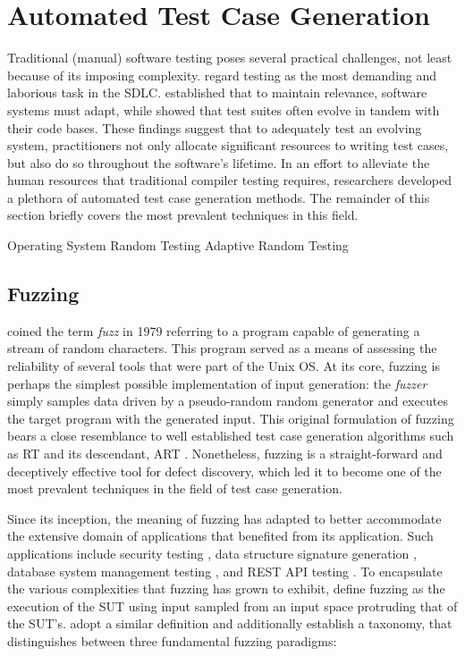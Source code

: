 \section{Automated Test Case Generation}

Traditional (manual) software testing poses several practical
challenges, not least because of its imposing complexity.
\citet{candea2019automated} regard testing as the most
demanding and laborious task in the \gls{SDLC}.
\citet{lehman1979understanding} established that to maintain
relevance, software systems must adapt, while \citet{zaidman2011studying}
showed that test suites often evolve in tandem with their code bases.
These findings suggest that to adequately test an evolving system,
practitioners not only allocate significant resources to writing test cases,
but also do so throughout the software's lifetime.
In an effort to alleviate the human resources that traditional compiler testing requires,
researchers developed a plethora of automated test case generation methods.
The remainder of this section briefly covers the most prevalent techniques
in this field.

 {Operating System}
 {Random Testing}
 {Adaptive Random Testing}

\subsection{Fuzzing}

\citet{miller1990empirical} coined the term \textit{fuzz} in 1979 referring
to a program capable of generating a stream of random characters.
This program served as a means of assessing
the reliability of several tools that were part of the Unix \Gls{OS}.
At its core, fuzzing is perhaps the simplest possible implementation
of input generation: the \textit{fuzzer} simply samples data
driven by a pseudo-random random generator and executes
the target program with the generated input.
This original formulation of fuzzing bears a close
resemblance to well established test case generation algorithms
such as \Gls{RT} \cite{duran1981report} and 
its descendant, \Gls{ART} \cite{chen2010adaptive}.
Nonetheless, fuzzing is a straight-forward and deceptively effective 
tool for defect discovery, which led it to become one
of the most prevalent techniques in the field of test case generation.

Since its inception, the meaning of fuzzing has adapted to
better accommodate the extensive domain of applications that
benefited from its application.
Such applications include security testing \cite{oehlert2005violating, stephens2016driller},
data structure signature generation \cite{dolan2009robust}, 
database system management testing \cite{zhong2020squirrel},
and REST API testing \cite{atlidakis2019restler, godefroid2020intelligent}.
To encapsulate the various complexities that fuzzing has grown
to exhibit, \citet{manes2019art} define fuzzing as the execution
of the \gls{SUT} using input sampled from an input space protruding
that of the \gls{SUT}'s.
\citet{saavedra2019review} adopt a similar definition and additionally
establish a taxonomy, that distinguishes between three 
fundamental fuzzing paradigms:

